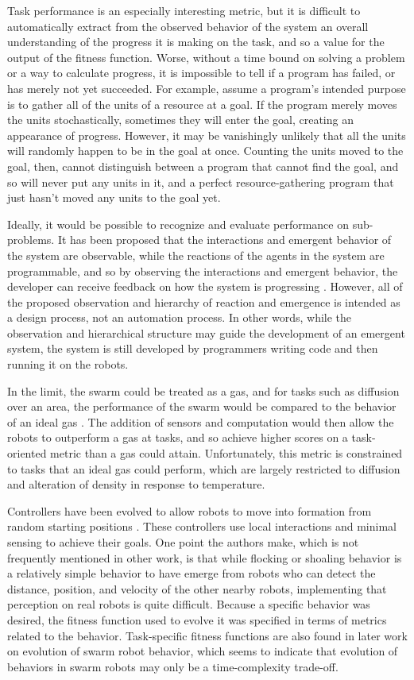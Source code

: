 \documentclass[]{article}
\begin{document}
Task performance is an especially interesting metric, but it is difficult to automatically extract from the observed behavior of the system an overall understanding of the progress it is making on the task, and so a value for the output of the fitness function. 
Worse, without a time bound on solving a problem or a way to calculate progress, it is impossible to tell if a program has failed, or has merely not yet succeeded.
For example, assume a program's intended purpose is to gather all of the units of a resource at a goal. 
If the program merely moves the units stochastically, sometimes they will enter the goal, creating an appearance of progress. 
However, it may be vanishingly unlikely that all the units will randomly happen to be in the goal at once. 
Counting the units moved to the goal, then, cannot distinguish between a program that cannot find the goal, and so will never put any units in it, and a perfect resource-gathering program that just hasn't moved any units to the goal yet.
 
Ideally, it would be possible to recognize and evaluate performance on sub-problems. 
It has been proposed that the interactions and emergent behavior of the system are observable, while the reactions of the agents in the system are programmable, and so by observing the interactions and emergent behavior, the developer can receive feedback on how the system is progressing \cite{palmer2005behavioral}. 
However, all of the proposed observation and hierarchy of reaction and emergence is intended as a design process, not an automation process. 
In other words, while the observation and hierarchical structure may guide the development of an emergent system, the system is still developed by programmers writing code and then running it on the robots.

In the limit, the swarm could be treated as a gas, and for tasks such as diffusion over an area, the performance of the swarm would be compared to the behavior of an ideal gas \cite{jantz1997kinetics}.
The addition of sensors and computation would then allow the robots to outperform a gas at tasks, and so achieve higher scores on a task-oriented metric than a gas could attain. 
Unfortunately, this metric is constrained to tasks that an ideal gas could perform, which are largely restricted to diffusion and alteration of density in response to temperature. 

Controllers have been evolved to allow robots to move into formation from random starting positions \cite{quinn2003evolving}. 
These controllers use local interactions and minimal sensing to achieve their goals. 
One point the authors make, which is not frequently mentioned in other work, is that while flocking or shoaling behavior is a relatively simple behavior to have emerge from robots who can detect the distance, position, and velocity of the other nearby robots, implementing that perception on real robots is quite difficult.
Because a specific behavior was desired, the fitness function used to evolve it was specified in terms of metrics related to the behavior. 
Task-specific fitness functions are also found in later work on evolution of swarm robot behavior, which seems to indicate that evolution of behaviors in swarm robots may only be a time-complexity trade-off. 
\end{document}
